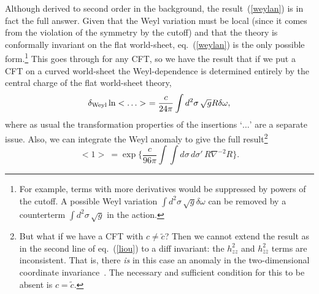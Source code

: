Although derived to second order in the background, the
result~(\ref{weylan}) is in fact the full answer.  Given that the
Weyl variation must be local (since it comes from the violation
of the symmetry by the cutoff) and that the theory is
conformally invariant on the flat world-sheet,
eq.~(\ref{weylan}) is the only possible form.\footnote{For
example, terms with more derivatives would be suppressed by
powers of the cutoff.  A possible Weyl variation
$\int d^2\sigma\,\sqrt{g}\delta\omega$ can be removed by a
counterterm $\int d^2\sigma\,\sqrt{g}$ in the action.} This
goes through for any CFT, so we have the result that if we put
a CFT on a curved world-sheet the Weyl-dependence is
determined entirely by the central charge of the flat
world-sheet theory,
\begin{equation}
\delta_{\rm Weyl} \ln < \ldots >
\ = \frac{c}{24\pi} \int d^2\sigma\,\sqrt{g}R\delta\omega,
\end{equation}
where as usual the transformation properties of the insertions
`$\ldots$' are a separate issue.
Also, we can integrate the Weyl anomaly to give the full
result\footnote
{But what if we have a CFT with $c \neq \tilde c$?
Then we cannot extend the result as in the second line of
eq.~(\ref{liou}) to a diff invariant: the $h_{zz}^2$ and $h_{\bar z
\bar z}^2$ terms are inconsistent.  That is, there {\it is} in
this case an anomaly in the two-dimensional coordinate
invariance~\cite{A-GW}.  The necessary and sufficient condition for
this to be absent is $c = \tilde c$.}
\begin{equation}
<1>\ = \exp\biggl\{\frac{c}{96\pi} \int\!\int d\sigma\,d\sigma'\,
R \nabla^{-2} R \biggr\}.
\end{equation}


